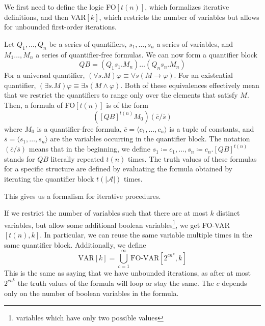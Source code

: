We first need to define the logic FO$[t(n)]$, which formalizes iterative definitions, and then VAR$[k]$, which restricts the number of variables but allows for unbounded first-order iterations.

\begin{define}[{FO$[t(n)]$}]
    Let $Q_1, \dots, Q_n$ be a series of quantifiers, $s_1, \dots, s_n$ a series of variables, and $M_1 \dots, M_n$ a series of quantifier-free formulas. %
    We can now form a quantifier block \[QB = (Q_{1}s_{1}.M_{n})\dots(Q_{n}s_{n}.M_{n})\]
    For a universal quantifier, $(\forall s.M)\varphi \equiv \forall s (M \to \varphi)$.
    For an existential quantifier, $(\exists s.M)\varphi \equiv \exists s(M \land \varphi)$.
    Both of these equivalences effectively mean that we restrict the quantifiers to range only over the elements that satisfy $M$.
    Then, a formula of FO$[t(n)]$ is of the form
    \[
        \left([QB]^{t(n)}M_{0}\right)(\overline{c} / \overline{s})
    \]
    where $M_0$ is a quantifier-free formula, $\overline{c} = \langle c_1, \dots, c_n \rangle$ is a tuple of constants, and $\overline{s} = \langle s_1, \dots, s_n \rangle$ are the variables occurring in the quantifier block.
    The notation $(\overline{c} / \overline{s})$ means that in the beginning, we define $s_1 \coloneqq c_1, \dots, s_n \coloneqq c_n$.$[QB]^{t(n)}$ stands for $QB$ literally repeated $t(n)$ times.
    The truth values of these formulas for a specific structure are defined by evaluating the formula obtained by iterating the quantifier block $t(|\mathcal{A}|)$ times.
\end{define}
This gives us a formalism for iterative procedures.

If we restrict the number of variables such that there are at most $k$ distinct variables, but allow some additional boolean variables\footnote{variables which have only two possible values}, we get FO-VAR$[t(n), k]$.
In particular, we can reuse the same variable multiple times in the same quantifier block.
Additionally, we define
\[
    \text{VAR}[k] = \bigcup_{c = 1}^{\infty}\text{FO-VAR}[2^{cn^k}, k]
\]
This is the same as saying that we have unbounded iterations, as after at most $2^{cn^k}$ the truth values of the formula will loop or stay the same.
The $c$ depends only on the number of boolean variables in the formula.

